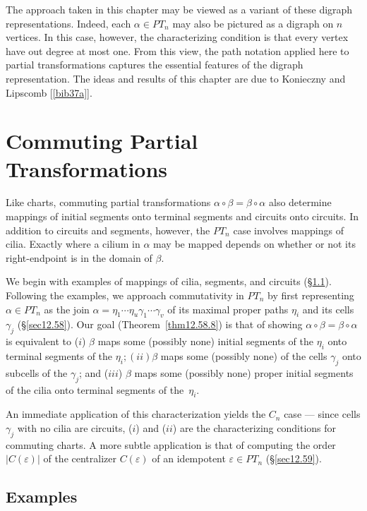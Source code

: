 \documentclass{surv-l}
\numberwithin{equation}{section}
\numberwithin{table}{section}
\numberwithin{figure}{section}
\theoremstyle{plain}
\theoremstyle{definition}
\begin{document}
The approach taken in this chapter may be viewed as a variant of
these digraph representations. Indeed, each $\alpha\in PT_{n}$ may
also be pictured as a digraph on $n$ vertices. In this case,
however, the characterizing condition is that every vertex have
out degree at most one. From this view, the path notation applied
here to partial transformations captures the essential features of
the digraph representation. The ideas and results of this chapter
are due to Konieczny and Lipscomb
[\ref{bib37a}].

\chapter{Commuting Partial Transformations}\label{chap12}

Like charts, commuting partial transformations $\alpha
\circ\beta=\beta \circ\alpha$ also determine mappings of initial
segments onto terminal segments and circuits onto circuits. In
addition to circuits and segments, however, the $PT_{n}$ case
involves mappings of cilia. Exactly where a cilium in $\alpha$ may
be mapped depends on whether or not its right-endpoint is in the
domain of $\beta$.

We begin with examples of mappings of cilia, segments, and
circuits (\S\ref{sec12.57}). Following the examples, we approach
commutativity in $PT_{n}$ by first representing $\alpha\in PT_{n}$
as the join
$\alpha=\eta_{1}\cdots\eta_{u}\gamma_{1}\cdots\gamma_{v}$ of its
maximal proper paths $\eta_{i}$ and its cells $\gamma_{j}$
(\S\ref{sec12.58}). Our goal (Theorem~\ref{thm12.58.8}) is that of
showing $\alpha \circ\beta=\beta \circ\alpha$ is equivalent to
($i$) $\beta$ maps some (possibly none) initial segments of the
$\eta_{i}$ onto terminal segments of the $\eta_{i}; (ii)\beta$
maps some (possibly none) of the cells $\gamma_{j}$ onto subcells
of the $\gamma_{j}$; and ($iii$) $\beta$ maps some (possibly none)
proper initial segments of the cilia onto terminal segments of
the~$\eta_{i}$.

An immediate application of this characterization yields the
$C_{n}$ case --- since cells $\gamma_{j}$ with no cilia are
circuits, ($i$) and ($ii$) are the characterizing conditions for
commuting charts. A more subtle application is that of computing
the order $|C(\varepsilon)|$ of the centralizer $C(\varepsilon)$
of an idempotent $\varepsilon\in PT_{n}$ (\S\ref{sec12.59}).

\setcounter{section}{56}
\section{Examples}\label{sec12.57}
\end{document}
